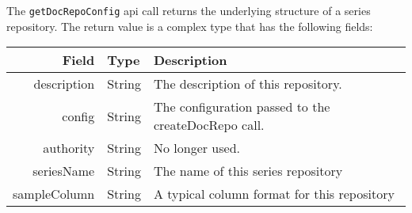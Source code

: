 The \verb+getDocRepoConfig+ api call returns the underlying structure of a series repository. The return
value is a complex type that has the following fields:

\begin{table}[h]
\begin{center}
\begin{tabular}{r l p{8cm}}
  Field & Type & Description \\
  \hline
  description & String & The description of this repository. \\
  config & String & The configuration passed to the createDocRepo call. \\
  authority & String & No longer used. \\
  seriesName & String & The name of this series repository \\
  sampleColumn & String & A typical column format for this repository \\
\end{tabular}
\end{center}
\end{table}
